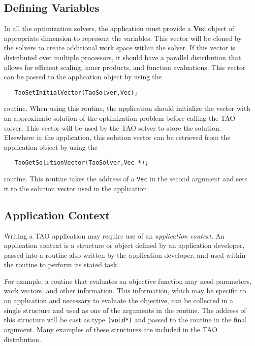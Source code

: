 \subsection{Defining Variables}
In all the optimization solvers, the application must provide
a {\bf Vec} object of appropriate dimension to represent the variables.
This vector will be cloned by the solvers to create additional work
space within the solver.
If this vector is distributed over multiple processors, it
should have a parallel distribution that allows
for efficient scaling, inner products, and
function evaluations.  This vector can be passed to the
application object by using the  
\begin{verbatim}
   TaoSetInitialVector(TaoSolver,Vec);
\end{verbatim}
routine. 
When using this routine, the application should initialize the vector with
an approximate solution of the optimization problem before calling the
TAO solver.
This vector will be used by the TAO solver to store the solution.
Elsewhere in the application, 
this solution vector can be retrieved from the application object 
by using the  
\begin{verbatim}
   TaoGetSolutionVector(TaoSolver,Vec *);
\end{verbatim}
routine. 
This routine takes the address of a {\tt Vec} in the second argument and sets it to
the solution vector used in the application.

\subsection{Application Context}  
Writing a TAO application may require
use of an {\em application context}.
An application context is a structure or object defined by an
application developer, passed
into a routine also written by the application developer, 
and used within the routine to perform its stated task.
 
For example, a routine that evaluates an objective function may need
parameters, work vectors, and other information.   This information,
which may be specific to an application and necessary to evaluate the objective,
can be collected in a single structure and used as one of the
arguments in the routine.
The address of this structure will be cast as type {\tt (void*)} and passed to
the routine in the final argument.
Many examples of these structures are included in the
TAO distribution.

